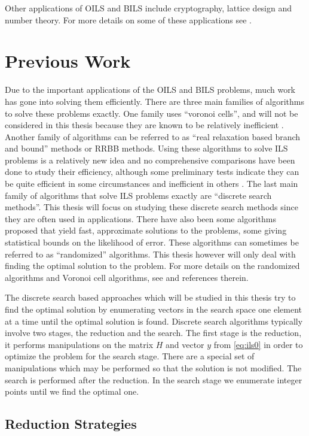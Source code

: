 \documentclass[12pt,Bold,letterpaper]{mcgilletdclass}
\newcommand{\vsp}{\vspace{\baselineskip}}
\begin{document}
Other applications of OILS and BILS include cryptography, lattice design and number theory. For more details on some of these applications see \cite{HanPS11}.

\vsp \section{Previous Work} \label{sec:prevWork}
Due to the important applications of the OILS and BILS problems, much work has
gone into solving them efficiently. There are three main families of algorithms to solve these problems exactly. One family uses ``voronoi cells'', and will not be considered in this thesis because they are known to be relatively
inefficient \cite{HanPS11}. Another family of algorithms can be referred to as ``real
relaxation based branch and bound'' methods or RRBB methods. Using these algorithms to solve ILS
problems is a relatively new idea and no comprehensive comparisons have been
done to study their efficiency, although some preliminary tests indicate they
can be quite efficient in some circumstances and inefficient in others \cite{Ku11}. The last main family of algorithms
that solve ILS problems exactly are ``discrete search methods''. This thesis
will focus on studying these discrete search methods since they are often used in applications. There have also been some algorithms proposed that yield fast,
approximate solutions to the problems, some giving statistical bounds on the
likelihood of error. These algorithms can sometimes be referred to as
``randomized'' algorithms. This thesis however will only deal with finding the
optimal solution to the problem. For more details on the randomized algorithms
and Voronoi cell algorithms, see \cite{HanPS11} and references therein.

The discrete search based approaches which will be studied in this thesis try to find the optimal solution by enumerating vectors in the search space one element at a time until the optimal solution is found. Discrete search algorithms typically involve two stages, the reduction and the search. The first stage is the reduction, it performs manipulations on the matrix $H$ and vector $y$ from \eqref{eq:ils0} in order to optimize the problem for the search stage. There are a special set of manipulations which may be performed so that the solution is not modified. The search is performed after the reduction. In the search stage we enumerate integer points until we find the optimal one.

\vsp \subsection{Reduction Strategies} \label{subsec:Reductions}
\end{document}
